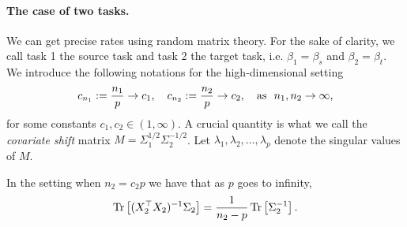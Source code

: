 \paragraph{The case of two tasks.}
We can get precise rates using random matrix theory.
For the sake of clarity, we call task 1 the source task and task 2 the target task,
i.e. $\beta_1 = \beta_s$ and $\beta_2 = \beta_t$.
We introduce the following notations for the high-dimensional setting
\[ c_{n_1} := \frac{n_1}{p} \to c_1, \quad c_{n_2} := \frac{n_2}p \to c_2, \quad \text{as } \ n_1, n_2\to \infty, \]
for some constants $c_1, c_2 \in (1,\infty)$.
A crucial quantity is what we call the \textit{covariate shift} matrix $M = \Sigma_1^{1/2}\Sigma_2^{-1/2}$.
Let $\lambda_1, \lambda_2, \dots, \lambda_p$ denote the singular values of $M$.

\begin{lemma}\label{lem_minv}
	In the setting when $n_2 = c_2 p$ we have that as $p$ goes to infinity,
	\[ \operatorname{Tr}\left[(X_2^{\top}X_2)^{-1}\Sigma_2\right] = \frac{1}{n_2 - p}\operatorname{Tr}\left[\Sigma_2^{-1}\right]. \]
\end{lemma}